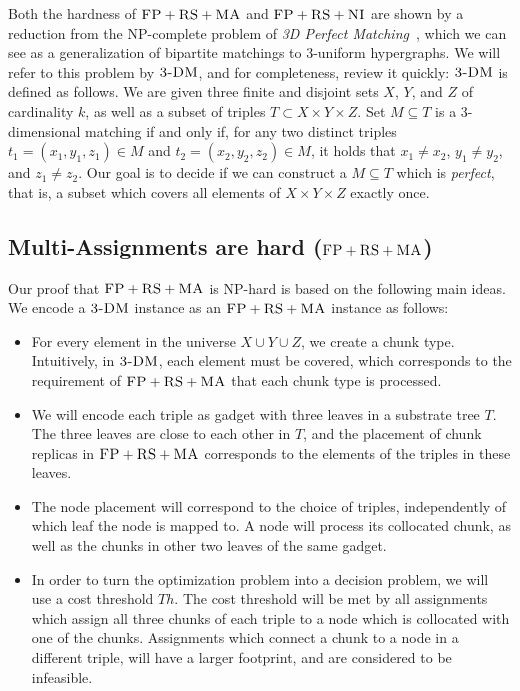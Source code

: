 \documentclass[preprint,12pt]{elsarticle}
\newcommand{\CC}{\textsc{NI}}
\newcommand{\FP}{\textsc{FP}}
\newcommand{\RS}{\textsc{RS}}
\newcommand{\MA}{\textsc{MA}}
\newcommand{\Tree}{\ensuremath{T}}
\newcommand{\TDM}{\textsc{3-DM}}
\newcommand{\Thr}{\ensuremath{Th}}
\begin{document}
Both the hardness of $\FP+\RS+\MA$ and $\FP+\RS+\CC$ are shown by a reduction
from the NP-complete problem of \emph{3D Perfect Matching}~\cite{3dmatch},
which we can see as a generalization of bipartite matchings to 3-uniform
hypergraphs. We will refer to this problem by $\TDM$, and for completeness,
review it quickly:
$\TDM$ is defined as follows. We are given three finite and disjoint
sets $X$, $Y$, and $Z$ of cardinality $k$, as well as a subset of triples $T\subset
X \times Y \times Z$.  Set $M \subseteq T$ is a 3-dimensional matching
if and only if, for any two distinct triples $t_1=(x_1, y_1, z_1) \in M$
and $t_2=(x_2, y_2, z_2) \in M$, it holds that $x_1\neq x_2$, $y_1\neq
y_2$, and $z_1\neq z_2$. Our goal is to decide if we can construct
a $M \subseteq T$ which is \emph{perfect}, that is, a subset which covers all
elements of $X \times Y \times Z$ exactly once.


\subsection{Multi-Assignments are hard ($\FP+\RS+\MA$)}\label{ssec:fprsma}

Our proof that $\FP+\RS+\MA$ is NP-hard is based on the following main ideas.
We encode a $\TDM$ instance as an $\FP+\RS+\MA$ instance as follows:

 \begin{itemize}
 \item For every element in the universe $X\cup Y\cup
 Z$, we create a chunk type. Intuitively, in $\TDM$,
 each element must be covered, which corresponds to the requirement
 of $\FP+\RS+\MA$
 that each chunk type is processed.

 \item We will encode each triple as gadget with three leaves in
 a substrate tree $\Tree$. The three leaves are close to each
 other in $\Tree$, and the placement of chunk replicas in $\FP+\RS+\MA$
 corresponds to the elements of the
 triples in these leaves.

 \item The node placement will correspond to the choice of triples,
 independently of which
leaf the node is mapped to.
 A node will process its collocated chunk,
 as well as the chunks in other two leaves of the same gadget.

\item In order to turn the optimization problem into a decision problem, we will use
a cost threshold $\Thr$. The cost threshold will be met by all
assignments which assign all three chunks of each triple to a
node which is collocated with one of the chunks. Assignments which connect a
chunk to a node in a different triple, will have a larger footprint, and are
considered to be infeasible.

\end{itemize}
\end{document}
